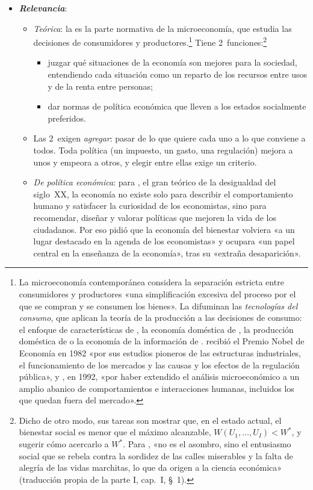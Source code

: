 \documentclass[11pt]{article}
\begin{document}
\begin{itemize}
\item \textbf{\emph{Relevancia}}:
  \begin{itemize}
  \item \emph{Teórica}: la  es la parte normativa de la microeconomía, que estudia las decisiones de consumidores y productores.\footnote{La microeconomía contemporánea considera la separación estricta entre consumidores y productores «una simplificación excesiva del proceso por el que se compran y se consumen los bienes»\nocite{EkelundHebert2013History}. La difuminan las \emph{tecnologías del consumo}, que aplican la teoría de la producción a las decisiones de consumo: el enfoque de características de , la economía doméstica de , la producción doméstica de  o la economía de la información de .  recibió el Premio Nobel de Economía en 1982 «por sus estudios pioneros de las estructuras industriales, el funcionamiento de los mercados y las causas y los efectos de la regulación pública»\nocite{Nobel1982Stigler}, y , en 1992, «por haber extendido el análisis microeconómico a un amplio abanico de comportamientos e interacciones humanas, incluidos los que quedan fuera del mercado»\nocite{Nobel1992Becker}.} Tiene 2~funciones\nocite{Koutsoyiannis1979Modern}:\footnote{Dicho de otro modo, sus tareas son mostrar que, en el estado actual, el bienestar social es menor que el máximo alcanzable, $W(U_1,\dots,U_I)<W^*$, y sugerir cómo acercarlo a $W^*$\nocite{Koutsoyiannis1979Modern}. Para \textcite{Pigou1920Economics}, «no es el asombro, sino el entusiasmo social que se rebela contra la sordidez de las calles miserables y la falta de alegría de las vidas marchitas, lo que da origen a la ciencia económica» (traducción propia de la parte I, cap.~I, §~1).}
    \begin{itemize}
    \item juzgar qué situaciones de la economía son mejores para la sociedad, entendiendo cada situación como un reparto de los recursos entre usos y de la renta entre personas;
    \item dar normas de política económica que lleven a los estados socialmente preferidos.
    \end{itemize}
  \item Las 2~exigen \emph{agregar}: pasar de lo que quiere cada uno a lo que conviene a todos. Toda política (un impuesto, un gasto, una regulación) mejora a unos y empeora a otros, y elegir entre ellas exige un criterio.
  \item \emph{De política económica}: para , el gran teórico de la desigualdad del siglo~XX, la economía no existe solo para describir el comportamiento humano y satisfacer la curiosidad de los economistas, sino para recomendar, diseñar y valorar políticas que mejoren la vida de los ciudadanos\nocite{Jimeno2017AtkinsonI,Atkinson2009Moral}. Por eso pidió que la economía del bienestar volviera «a un lugar destacado en la agenda de los economistas» y ocupara «un papel central en la enseñanza de la economía»\nocite{Atkinson2011Restoration}, tras su «extraña desaparición»\nocite{Atkinson2001Strange}.

\end{itemize}
\end{itemize}
\end{document}
